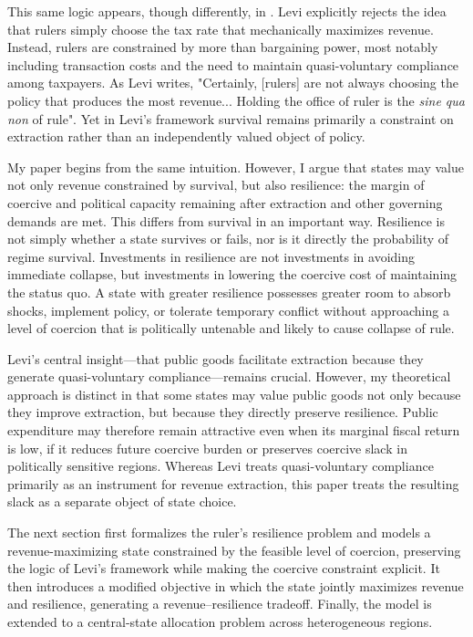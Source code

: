 \documentclass[12pt]{article}
\begin{document}
This same logic appears, though differently, in \textcite{levi1988}. Levi explicitly rejects the idea that rulers simply choose the tax rate that mechanically maximizes revenue. Instead, rulers are constrained by more than bargaining power, most notably including transaction costs and the need to maintain quasi-voluntary compliance among taxpayers. As Levi writes, "Certainly, [rulers] are not always choosing the policy that produces the most revenue... Holding the office of ruler is the \textit{sine qua non} of rule". Yet in Levi's framework survival remains primarily a constraint on extraction rather than an independently valued object of policy.

My paper begins from the same intuition. However, I argue that states may value not only revenue constrained by survival, but also resilience: the margin of coercive and political capacity remaining after extraction and other governing demands are met. This differs from survival in an important way. Resilience is not simply whether a state survives or fails, nor is it directly the probability of regime survival. Investments in resilience are not investments in avoiding immediate collapse, but investments in lowering the coercive cost of maintaining the status quo. A state with greater resilience possesses greater room to absorb shocks, implement policy, or tolerate temporary conflict without approaching a level of coercion that is politically untenable and likely to cause collapse of rule.

Levi's central insight---that public goods facilitate extraction because they generate quasi-voluntary compliance---remains crucial. However, my theoretical approach is distinct in that some states may value public goods not only because they improve extraction, but because they directly preserve resilience. Public expenditure may therefore remain attractive even when its marginal fiscal return is low, if it reduces future coercive burden or preserves coercive slack in politically sensitive regions. Whereas Levi treats quasi-voluntary compliance primarily as an instrument for revenue extraction, this paper treats the resulting slack as a separate object of state choice.

The next section first formalizes the ruler's resilience problem and models a revenue-maximizing state constrained by the feasible level of coercion, preserving the logic of Levi's framework while making the coercive constraint explicit. It then introduces a modified objective in which the state jointly maximizes revenue and resilience, generating a revenue--resilience tradeoff. Finally, the model is extended to a central-state allocation problem across heterogeneous regions.
\end{document}
